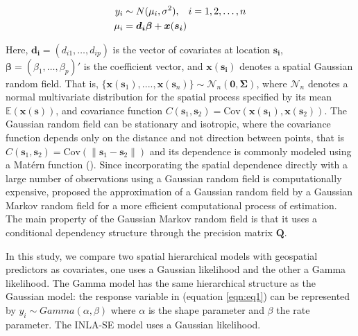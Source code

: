 \documentclass{article}
\begin{document}
\begin{align}
y_i & \sim N(\mu_i, \sigma^2), \hspace{3mm} i = 1, 2, \ldots, n \label{eqn:eq1}\\
\mu_i & = \boldsymbol{d_i \beta} + \boldsymbol{x}(\boldsymbol{s_i}) \label{eqn:eq2}
\end{align}

 
Here, $\boldsymbol{d_i} = (d_{i1}, \ldots, d_{ip})$ is the vector of covariates at location $\boldsymbol{s_i}$, $\boldsymbol{\beta}=(\beta_1, \ldots, \beta_p)'$ is the coefficient vector, and $\boldsymbol{x}(\boldsymbol{s_i})$ denotes a spatial Gaussian random field. That is, $\{\boldsymbol{x}(\boldsymbol{s}_{1}),...., \boldsymbol{x}(\boldsymbol{s}_{n})\} \sim \mathcal{N}_{n}(\boldsymbol{0}, \boldsymbol{\Sigma})$, where $\mathcal{N}_{n}$ denotes a normal multivariate distribution for the spatial process specified by its mean $\mathbb{E}(\boldsymbol{x}(\boldsymbol{s}))$, and covariance function $C(\boldsymbol{s}_{1}, \boldsymbol{s}_{2}) = \text{Cov}(\boldsymbol{x}(\boldsymbol{s}_{1}), \boldsymbol{x}(\boldsymbol{s}_{2}))$. The Gaussian random field can be stationary and isotropic, where the covariance function depends only on the distance and not direction between points, that is $C(\boldsymbol{s}_{1}, \boldsymbol{s}_{2}) = \text{Cov}(\|\boldsymbol{s}_{1} - \boldsymbol{s}_{2}\|)$ and its dependence is commonly modeled using a Matérn function (\cite{stein2012interpolation, yuan2011models, diggleetal2013}). Since incorporating the spatial dependence directly with a large number of observations using a Gaussian random field is computationally expensive, \cite{rue2005gaussian} proposed the approximation of a Gaussian random field by a Gaussian Markov random field for a more efficient computational process of estimation. The main property of the Gaussian Markov random field is that it uses a conditional dependency structure through the precision matrix $\boldsymbol{Q}$. 




In this study, we compare two spatial hierarchical  models with geospatial predictors as covariates, one uses a Gaussian likelihood and the other a Gamma likelihood. The Gamma model has the same hierarchical structure as the Gaussian model: the response variable in (equation \ref{eqn:eq1}) can be represented by $y_{i} \sim Gamma(\alpha, \beta)$ where $\alpha$ is the shape parameter and $\beta$ the rate parameter. The INLA-SE model uses a Gaussian likelihood.
\end{document}
